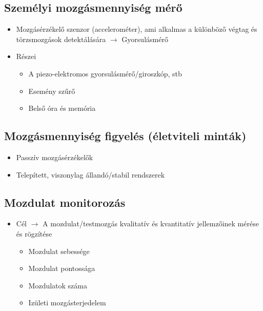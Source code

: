 \clearpage
\subsection{Személyi mozgásmennyiség mérő}
\begin{itemize}
    \item Mozgásérzékelő szenzor (accelerométer), ami alkalmas a különböző végtag és törzsmozgások detektálására $\rightarrow$ Gyorsulásmérő
    \item Részei
    \begin{itemize}
        \item A piezo-elektromos gyorsulásmérő/giroszkóp, stb
        \item Esemény szűrő
        \item Belső óra és memória
    \end{itemize}
\end{itemize}

\subsection{Mozgásmennyiség figyelés (életviteli minták)}
\begin{itemize}
    \item Passzív mozgásérzékelők
    \item Telepített, viszonylag állandó/stabil rendszerek
\end{itemize}

\subsection{Mozdulat monitorozás}
\begin{itemize}
    \item Cél $\rightarrow$ A mozdulat/testmozgás kvalitatív és kvantitatív jellemzőinek mérése és rögzítése
    \begin{itemize}
        \item Mozdulat sebessége
        \item Mozdulat pontossága
        \item Mozdulatok száma
        \item Izületi mozgásterjedelem
    \end{itemize}
\end{itemize}

\clearpage
